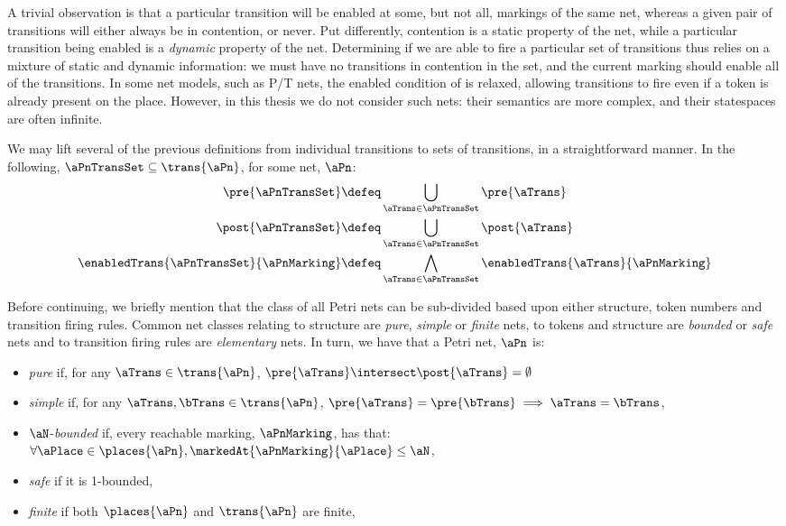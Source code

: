 \begin{remark}\label{rem:contentionEnabled}
    A trivial observation is that a particular transition will be enabled at
    some, but not all, markings of the same net, whereas a given pair of
    transitions will either always be in contention, or never. Put differently,
    contention is a static property of the net, while a particular transition
    being enabled is a \emph{dynamic} property of the net. Determining if we
    are able to fire a particular set of transitions thus relies on a mixture
    of static and dynamic information: we must have no transitions in
    contention in the set, and the current marking should enable all of the
    transitions. In some net models, such as P/T nets, the enabled condition of
     is relaxed, allowing transitions to fire even
    if a token is already present on the place. However, in this thesis we do
    not consider such nets: their semantics are more complex, and their
    statespaces are often infinite.
\end{remark}

We may lift several of the previous definitions from individual transitions to
sets of transitions, in a straightforward manner. In the following,
$\aPnTransSet \subseteq \trans{\aPn}$, for some net, $\aPn$:
\begin{align*}
    \pre{\aPnTransSet} &\defeq \bigcup_{\aTrans \in
        \aPnTransSet}\pre{\aTrans}\\
    \post{\aPnTransSet} &\defeq \bigcup_{\aTrans \in
        \aPnTransSet}\post{\aTrans}\\
    \enabledTrans{\aPnTransSet}{\aPnMarking} &\defeq \bigwedge_{\aTrans
            \in \aPnTransSet}\enabledTrans{\aTrans}{\aPnMarking}
\end{align*}

\begin{remark}\label{rem:classes}
Before continuing, we briefly mention that the class of all Petri nets can be
sub-divided based upon either structure, token numbers and transition firing
rules. Common net classes relating to structure are \emph{pure}, \emph{simple}
or \emph{finite} nets, to tokens and structure are \emph{bounded} or
\emph{safe} nets and to transition firing rules are \emph{elementary} nets.
In turn, we have that a Petri net, $\aPn$ is:
\begin{itemize}
    \item \emph{pure} if, for any $\aTrans \in \trans{\aPn}$, $\pre{\aTrans}
        \intersect \post{\aTrans} = \emptyset$
    \item \emph{simple} if, for any $\aTrans, \bTrans \in \trans{\aPn}$,
        $\pre{\aTrans} = \pre{\bTrans} \implies \aTrans = \bTrans$,
    \item $\aN$-\emph{bounded} if, every reachable marking, $\aPnMarking$, has
        that: $\forall \aPlace \in \places{\aPn},
        \markedAt{\aPnMarking}{\aPlace} \le \aN$,
    \item \emph{safe} if it is 1-bounded,
    \item \emph{finite} if both $\places{\aPn}$ and $\trans{\aPn}$ are finite,
\end{itemize}
\end{remark}

